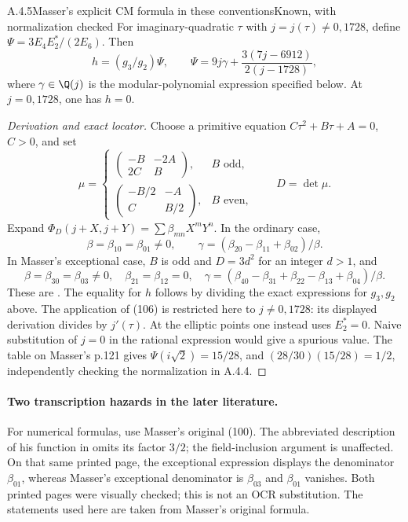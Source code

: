 \begin{result}{A.4.5}{Masser's explicit CM formula in these conventions}{Known, with normalization checked}
For imaginary-quadratic $\tau$ with $j=j(\tau)\ne0,1728$, define $\Psi=3E_4E_2^*/(2E_6)$. Then
\[
 h=(g_3/g_2)\Psi,\qquad
 \Psi=9j\gamma+\frac{3(7j-6912)}{2(j-1728)},
\]
where $\gamma\in\Q(j)$ is the modular-polynomial expression specified below. At $j=0,1728$, one has $h=0$.
\end{result}
\begin{proof}[Derivation and exact locator]
Choose a primitive equation $C\tau^2+B\tau+A=0$, $C>0$, and set
\[
 \mu=\begin{cases}
 \begin{pmatrix}-B&-2A\\2C&B\end{pmatrix},&B\text{ odd},\\[2mm]
 \begin{pmatrix}-B/2&-A\\C&B/2\end{pmatrix},&B\text{ even},
 \end{cases}\qquad D=\det\mu.
\]
Expand $\Phi_D(j+X,j+Y)=\sum\beta_{mn}X^mY^n$. In the ordinary case,
\[
 \beta=\beta_{10}=\beta_{01}\ne0,\qquad
 \gamma=(\beta_{20}-\beta_{11}+\beta_{02})/\beta.
\]
In Masser's exceptional case, $B$ is odd and $D=3d^2$ for an integer $d>1$, and
\[
 \beta=\beta_{30}=\beta_{03}\ne0,\quad \beta_{21}=\beta_{12}=0,
 \quad \gamma=(\beta_{40}-\beta_{31}+\beta_{22}-\beta_{13}+\beta_{04})/\beta.
\]
These are \cite[Lemmas A1--A2, pp.116--118, and (105)--(106), pp.118--119]{EllMasser1975}. The equality for $h$ follows by dividing the exact expressions for $g_3,g_2$ above. The application of (106) is restricted here to $j\ne0,1728$: its displayed derivation divides by $j'(\tau)$. At the elliptic points one instead uses $E_2^*=0$. Naive substitution of $j=0$ in the rational expression would give a spurious value. The table on Masser's p.121 gives $\Psi(i\sqrt2)=15/28$, and $(28/30)(15/28)=1/2$, independently checking the normalization in A.4.4.
\end{proof}

\paragraph{Two transcription hazards in the later literature.}
For numerical formulas, use Masser's original (100). The abbreviated description of his function in \cite[p.774]{EllSpence2018} omits its factor $3/2$; the field-inclusion argument is unaffected. On that same printed page, the exceptional expression displays the denominator $\beta_{01}$, whereas Masser's exceptional denominator is $\beta_{03}$ and $\beta_{01}$ vanishes. Both printed pages were visually checked; this is not an OCR substitution. The statements used here are taken from Masser's original formula.

